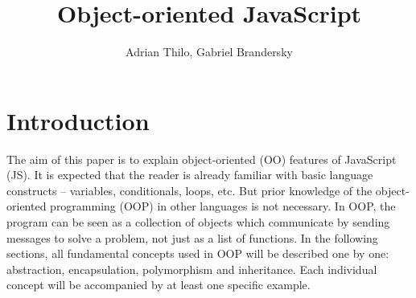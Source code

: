 \documentclass{bioinfo}
\begin{document}

\title[OO JS]{Object-oriented JavaScript}
\author[]{Adrian Thilo, Gabriel Brandersky}
\address{}

\history{}

\editor{}
\maketitle


\section{Introduction}

The aim of this paper is to explain object-oriented (OO) features of JavaScript (JS). It is expected that the reader is already familiar with basic language constructs -- variables, conditionals, loops, etc. But prior knowledge of the object-oriented programming (OOP) in other languages is not necessary. In OOP, the program can be seen as a collection of objects which communicate by sending messages to solve a problem, not just as a list of functions. In the following sections, all fundamental concepts used in OOP will be described one by one: abstraction, encapsulation, polymorphism and inheritance. Each individual concept will be accompanied by at least one specific example.

\end{document}
